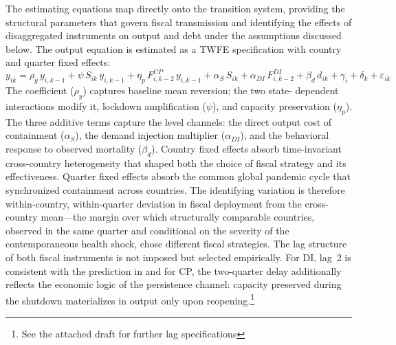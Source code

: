 \documentclass[12pt, a4paper]{article}
\begin{document}
The estimating equations map directly onto the transition system, providing the structural parameters that govern fiscal transmission and identifying the effects of disaggregated instruments on output and debt under the assumptions discussed below. The output equation is estimated as a TWFE specification with country and quarter fixed effects:
%
\begin{equation}
    y_{ik} = \rho_y\, y_{i,k-1}
    + \psi\, S_{ik}\, y_{i,k-1}
    + \eta_p\, F^{CP}_{i,k-2}\, y_{i,k-1}
    + \alpha_S\, S_{ik}
    + \alpha_{DI}\, F^{DI}_{i,k-2}
    + \beta_d\, d_{ik}
    + \gamma_i + \delta_k + \varepsilon_{ik}
\end{equation}
%
The coefficient ($\rho_y$) captures baseline mean reversion; the two state-
dependent interactions modify it, lockdown amplification ($\psi$), and capacity preservation ($\eta_p$). The three additive terms capture the level channels: the direct output cost of containment ($\alpha_S$), the demand injection multiplier ($\alpha_{DI}$), and the behavioral response to observed mortality ($\beta_d$). Country fixed effects absorb time-invariant cross-country heterogeneity that shaped both the choice of fiscal strategy and its effectiveness. Quarter fixed effects absorb the common global pandemic cycle that synchronized containment across countries. The identifying variation is therefore within-country, within-quarter deviation in fiscal deployment from the cross-country mean---the margin over which structurally comparable countries, observed in the same quarter and conditional on the severity of the contemporaneous health shock, chose different fiscal strategies. The lag structure of both fiscal instruments is not imposed but selected empirically. For DI, lag~2 is consistent with the prediction in \citet{guerrieri2022} and for CP, the two-quarter delay additionally reflects the economic logic of the persistence channel: capacity preserved during the shutdown materializes in output only upon reopening.\footnote{See the attached draft for further lag specifications}
\end{document}

